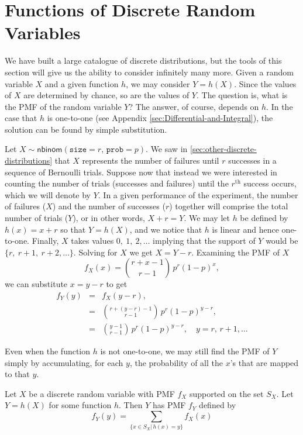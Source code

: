 \documentclass[captions=tableheading]{scrbook}
\begin{document}
\section{Functions of Discrete Random Variables}
\label{sec-5-7}

\label{sec:functions-discrete-rvs}

We have built a large catalogue of discrete distributions, but the tools of this section will give us the ability to consider infinitely many more. Given a random variable \(X\) and a given function \(h\), we may consider \(Y=h(X)\). Since the values of \(X\) are determined by chance, so are the values of \(Y\). The question is, what is the PMF of the random variable \(Y\)? The answer, of course, depends on \(h\). In the case that \(h\) is one-to-one (see Appendix \ref{sec:Differential-and-Integral}), the solution can be found by simple substitution.

\begin{example}
Let \(X\sim\mathsf{nbinom}(\mathtt{size}=r,\,\mathtt{prob}=p)\). We saw in \ref{sec:other-discrete-distributions} that \(X\) represents the number of failures until \(r\) successes in a sequence of Bernoulli trials. Suppose now that instead we were interested in counting the number of trials (successes and failures) until the \(r^{\mathrm{th}}\) success occurs, which we will denote by \(Y\). In a given performance of the experiment, the number of failures (\(X\)) and the number of successes (\(r\)) together will comprise the total number of trials (\(Y\)), or in other words, \(X+r=Y\). We may let \(h\) be defined by \(h(x)=x+r\) so that \(Y=h(X)\), and we notice that \(h\) is linear and hence one-to-one. Finally, \(X\) takes values \(0,\ 1,\ 2,\ldots\) implying that the support of \(Y\) would be \(\{ r,\ r+1,\ r+2,\ldots \}\). Solving for \(X\) we get \(X=Y-r\). Examining the PMF of \(X\)
\begin{equation}
f_{X}(x)={r+x-1 \choose r-1}\, p^{r}(1-p)^{x},
\end{equation}
we can substitute \( x = y - r \) to get
\begin{eqnarray*}
f_{Y}(y) & = & f_{X}(y-r),\\
 & = & {r+(y-r)-1 \choose r-1}\, p^{r}(1-p)^{y-r},\\
 & = & {y-1 \choose r-1}\, p^{r}(1-p)^{y-r},\quad y=r,\, r+1,\ldots
\end{eqnarray*}
\end{example}


Even when the function \(h\) is not one-to-one, we may still find the PMF of \(Y\) simply by accumulating, for each \(y\), the probability of all the \(x\)'s that are mapped to that \(y\).
\begin{prop}
Let \(X\) be a discrete random variable with PMF \(f_{X}\) supported on the set \(S_{X}\). Let \(Y=h(X)\) for some function \(h\). Then \(Y\) has PMF \(f_{Y}\) defined by
\begin{equation}
f_{Y}(y)=\sum_{\{x\in S_{X}|\, h(x)=y\}}f_{X}(x)
\end{equation}
\end{prop}
\end{document}
